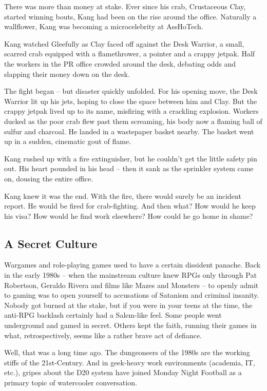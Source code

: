 \documentclass[a4paper,10pt]{article}
\begin{document}
There was more than money at stake. Ever since his crab, Crustaceous Clay, started winning bouts, Kang had been on the rise around the office. Naturally a wallflower, Kang was becoming a microcelebrity at AssHoTech.

Kang watched Gleefully as Clay faced off against the Desk Warrior, a small, scarred crab equipped with a flamethrower, a pointer and a crappy jetpak. Half the workers in the PR office crowded around the desk, debating odds and slapping their money down on the desk.

The fight began -- but disaster quickly unfolded. For his opening move, the Desk Warrior lit up his jets, hoping to close the space between him and Clay. But the crappy jetpak lived up to its name, misfiring with a crackling explosion. Workers ducked as the poor crab flew past them screaming, his body now a flaming ball of sulfur and charcoal. He landed in a wastepaper basket nearby. The basket went up in a sudden, cinematic gout of flame.

Kang rushed up with a fire extinguisher, but he couldn't get the little safety pin out. His heart pounded in his head -- then it sank as the sprinkler system came on, dousing the entire office.

Kang knew it was the end. With the fire, there would surely be an incident report. He would be fired for crab-fighting. And then what? How would he keep his visa? How would he find work elsewhere? How could he go home in shame?

\subsection*{A Secret Culture}
\label{sec:ASecretCulture}
Wargames and role-playing games used to have a certain dissident panache. Back in the early 1980s -- when the mainstream culture knew RPGs only through Pat Robertson, Geraldo Rivera and films like Mazes and Monsters -- to openly admit to gaming was to open yourself to accusations of Satanism and criminal insanity. Nobody got burned at the stake, but if you were in your teens at the time, the anti-RPG backlash certainly had a Salem-like feel. Some people went underground and gamed in secret. Others kept the faith, running their games in what, retrospectively, seems like a rather brave act of defiance.

Well, that was a long time ago. The dungeoneers of the 1980s are the working stiffs of the 21st-Century. And in geek-heavy work environments (academia, IT, etc.), gripes about the D20 system have joined Monday Night Football as a primary topic of watercooler conversation.
\end{document}
